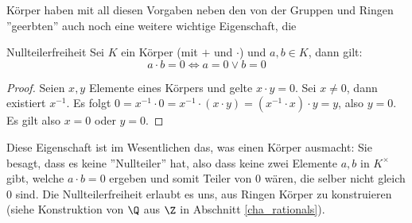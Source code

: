 Körper haben mit all diesen Vorgaben neben den von der Gruppen und Ringen ''geerbten'' auch noch eine weitere wichtige Eigenschaft, die

\begin{definition}{Nullteilerfreiheit}{} Sei $K$ ein Körper (mit $+$ und $\cdot$) und $a,b \in K$, dann gilt:
$$a \cdot b = 0 \iff a = 0 \lor b = 0$$
\end{definition}

\begin{proof}
Seien $x,y$ Elemente eines Körpers und gelte $x \cdot y = 0$. Sei $x \neq 0$, dann existiert $x^{-1}$. 
Es folgt $0 = x^{-1} \cdot 0 = x^{-1} \cdot (x \cdot y) = (x^{-1} \cdot x) \cdot y = y$, also $y = 0$. Es gilt also $x=0$ oder $y=0$.
\end{proof}

Diese Eigenschaft ist im Wesentlichen das, was einen Körper ausmacht: Sie besagt, dass es keine ''Nullteiler'' hat, also dass keine zwei Elemente $a,b$ in $K^\times$ gibt, welche $a \cdot b = 0$ ergeben und somit Teiler von $0$ wären, die selber nicht gleich $0$ sind. Die Nullteilerfreiheit erlaubt es uns, aus Ringen Körper zu konstruieren (siehe Konstruktion von $\Q$ aus $\Z$ in Abschnitt \ref{cha_rationals}). 

